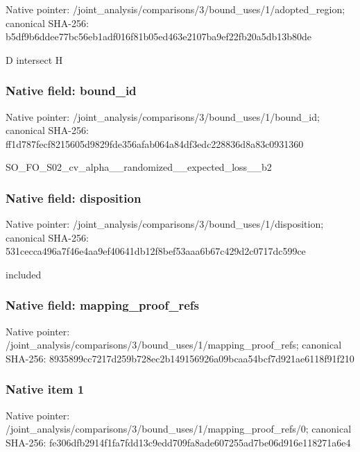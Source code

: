 \documentclass[10pt,a4paper]{article}
\begin{document}
Native pointer: /joint\_analysis/comparis\allowbreak{}ons/3/bound\_uses/1/adopt\allowbreak{}ed\_region; canonical SHA-256: b5df9b6ddee77bc56eb1adf0\allowbreak{}16f81b05ed463e2107ba9ef2\allowbreak{}2fb20a5db13b80de


D intersect H


\subsubsection{Native field: bound\_id}


Native pointer: /joint\_analysis/comparis\allowbreak{}ons/3/bound\_uses/1/bound\allowbreak{}\_id; canonical SHA-256: ff1d787fecf8215605d9829f\allowbreak{}de356afab064a84df3edc228\allowbreak{}836d8a83c0931360


SO\_FO\_S02\_cv\_alpha\_\_rand\allowbreak{}omized\_\_expected\_loss\_\_b\allowbreak{}2


\subsubsection{Native field: disposition}


Native pointer: /joint\_analysis/comparis\allowbreak{}ons/3/bound\_uses/1/dispo\allowbreak{}sition; canonical SHA-256: 531cecca496a7f46e4aa9ef4\allowbreak{}0641db12f8bef53aaa6b67c4\allowbreak{}29d2c0717dc599ce


included


\subsubsection{Native field: mapping\_proof\_refs}


Native pointer: /joint\_analysis/comparis\allowbreak{}ons/3/bound\_uses/1/mappi\allowbreak{}ng\_proof\_refs; canonical SHA-256: 8935899cc7217d259b728ec2\allowbreak{}b149156926a09bcaa54bcf7d\allowbreak{}921ae6118f91f210



\subsubsection{Native item 1}


Native pointer: /joint\_analysis/comparis\allowbreak{}ons/3/bound\_uses/1/mappi\allowbreak{}ng\_proof\_refs/0; canonical SHA-256: fe306dfb2914f1fa7fdd13c9\allowbreak{}edd709fa8ade607255ad7be0\allowbreak{}6d916e118271a6e4
\end{document}
